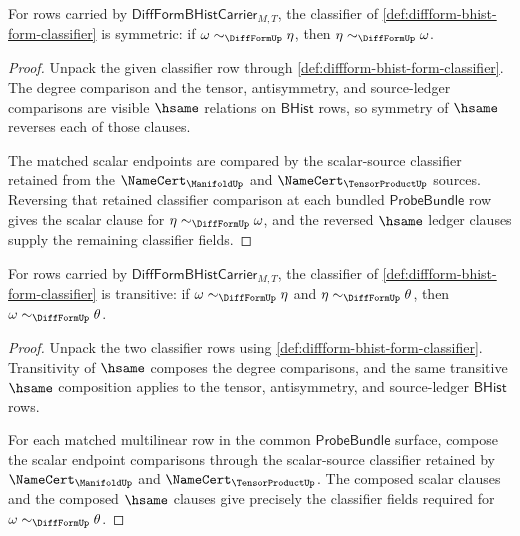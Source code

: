 \begin{theorem}
\label{thm:diffform-classifier-symmetry-obligation}
For rows carried by $\mathsf{DiffFormBHistCarrier}_{M,T}$, the classifier of
\autoref{def:diffform-bhist-form-classifier} is symmetric: if
$\omega\sim_{\DiffFormUp}\eta$, then $\eta\sim_{\DiffFormUp}\omega$.
\end{theorem}
\begin{proof}
Unpack the given classifier row through
\autoref{def:diffform-bhist-form-classifier}. The degree comparison and the
tensor, antisymmetry, and source-ledger comparisons are visible $\hsame$
relations on $\mathsf{BHist}$ rows, so symmetry of $\hsame$ reverses each of
those clauses.

The matched scalar endpoints are compared by the scalar-source classifier
retained from the $\NameCert_{\ManifoldUp}$ and $\NameCert_{\TensorProductUp}$
sources. Reversing that retained classifier comparison at each bundled
$\mathsf{ProbeBundle}$ row gives the scalar clause for
$\eta\sim_{\DiffFormUp}\omega$, and the reversed $\hsame$ ledger clauses supply
the remaining classifier fields.
\end{proof}

\begin{theorem}
\label{thm:diffform-classifier-transitivity-obligation}
For rows carried by $\mathsf{DiffFormBHistCarrier}_{M,T}$, the classifier of
\autoref{def:diffform-bhist-form-classifier} is transitive: if
$\omega\sim_{\DiffFormUp}\eta$ and $\eta\sim_{\DiffFormUp}\theta$, then
$\omega\sim_{\DiffFormUp}\theta$.
\end{theorem}
\begin{proof}
Unpack the two classifier rows using
\autoref{def:diffform-bhist-form-classifier}. Transitivity of $\hsame$ composes
the degree comparisons, and the same transitive $\hsame$ composition applies
to the tensor, antisymmetry, and source-ledger $\mathsf{BHist}$ rows.

For each matched multilinear row in the common $\mathsf{ProbeBundle}$ surface,
compose the scalar endpoint comparisons through the scalar-source classifier
retained by $\NameCert_{\ManifoldUp}$ and $\NameCert_{\TensorProductUp}$. The
composed scalar clauses and the composed $\hsame$ clauses give precisely the
classifier fields required for $\omega\sim_{\DiffFormUp}\theta$.
\end{proof}

